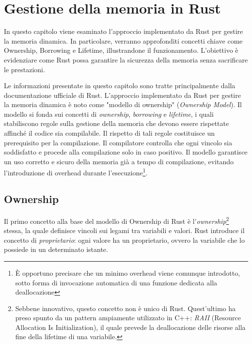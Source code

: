 
\chapter{Gestione della memoria in Rust}\label{cap:03}

In questo capitolo viene esaminato l'approccio implementato da Rust per gestire la memoria dinamica. In particolare, verranno approfonditi concetti chiave come Ownership, Borrowing e Lifetime, illustrandone il funzionamento. L'obiettivo è evidenziare come Rust possa garantire la sicurezza della memoria senza sacrificare le prestazioni.

Le informazioni presentate in questo capitolo sono tratte principalmente dalla documentazione ufficiale di Rust\cite{rust-lang}. \hfill
\vspace{15pt}
\noindent L'approccio implementato da Rust per gestire la memoria dinamica è noto come "modello di ownership" (\textit{Ownership Model}). Il modello si fonda sui concetti di \textit{ownership}, \textit{borrowing} e \textit{lifetime}, i quali stabiliscono regole sulla gestione della memoria che devono essere rispettate affinché il codice sia compilabile. Il rispetto di tali regole costituisce un prerequisito per la compilazione. Il compilatore controlla che ogni vincolo sia soddisfatto e procede alla compilazione solo in caso positivo. Il modello garantisce un uso corretto e sicuro della memoria già a tempo di compilazione, evitando l'introduzione di overhead durante l'esecuzione\footnote{È opportuno precisare che un minimo overhead viene comunque introdotto, sotto forma di invocazione  automatica di una funzione dedicata alla deallocazione}.
\section{Ownership}
Il primo concetto alla base del modello di Ownership di Rust è l'\textit{ownership}\footnote{Sebbene innovativo, questo concetto non è unico di Rust. Quest'ultimo ha preso spunto da un pattern ampiamente utilizzato in C++: \textit{RAII} (Resource Allocation Is Initialization), il quale prevede la deallocazione delle risorse alla fine della lifetime di una variabile.} stessa, la quale definisce vincoli sui legami tra variabili e valori. Rust introduce il concetto di \textit{proprietario}: ogni valore ha un proprietario, ovvero la variabile che lo possiede in un determinato istante.

